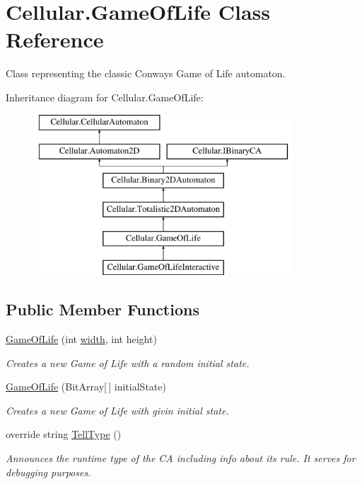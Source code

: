 \hypertarget{class_cellular_1_1_game_of_life}{}\section{Cellular.\+Game\+Of\+Life Class Reference}
\label{class_cellular_1_1_game_of_life}


Class representing the classic Conway\textquotesingle{}s Game of Life automaton.  


Inheritance diagram for Cellular.\+Game\+Of\+Life\+:\begin{figure}[H]
\begin{center}
\leavevmode
\includegraphics[height=6.000000cm]{class_cellular_1_1_game_of_life}
\end{center}
\end{figure}
\subsection*{Public Member Functions}
\begin{DoxyCompactItemize}
\item 
\hyperlink{class_cellular_1_1_game_of_life_afbc466540254767b2a93c45bdabf1da1}{Game\+Of\+Life} (int \hyperlink{class_cellular_1_1_automaton2_d_a1e9e5ec637c747a859c346839c90d174}{width}, int height)
\begin{DoxyCompactList}\small\item\em Creates a new Game of Life with a random initial state. \end{DoxyCompactList}\item 
\hyperlink{class_cellular_1_1_game_of_life_a13f744fc251176cf889b908bda8805c9}{Game\+Of\+Life} (Bit\+Array\mbox{[}$\,$\mbox{]} initial\+State)
\begin{DoxyCompactList}\small\item\em Creates a new Game of Life with givin initial state. \end{DoxyCompactList}\item 
override string \hyperlink{class_cellular_1_1_game_of_life_a9a8627c06f5cd9c4f0e99d3e78582c62}{Tell\+Type} ()
\begin{DoxyCompactList}\small\item\em Announces the runtime type of the C\+A including info about its rule. It serves for debugging purposes. \end{DoxyCompactList}\end{DoxyCompactItemize}
